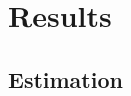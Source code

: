 \documentclass[xcolor=table,ignorenonframetext,12pt]{beamer}
\begin{document}
%
%
%
%
%
%
%
%
%
%
%
%
%
%
%
%


\section{Results}

\subsection{Estimation}
\end{document}
